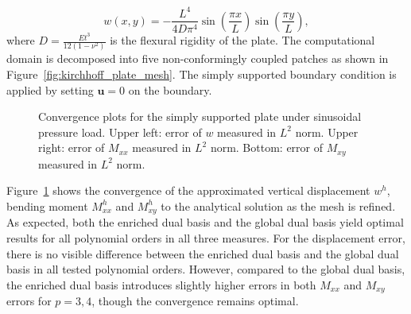 \begin{equation}
	w(x, y) = -\frac{L^4}{4D\pi^4}\sin(\frac{\pi x}{L}) \sin(\frac{\pi y}{L}),
\end{equation}
where $D = \frac{Et^3}{12(1-\nu^2)}$ is the flexural rigidity of the plate. The computational domain is decomposed into five non-conformingly coupled patches as shown in Figure~\ref{fig:kirchhoff_plate_mesh}. The simply supported boundary condition is applied by setting $\mathbf{u}=0$ on the boundary.\par
\begin{figure}[h]
	\center
	\captionsetup[subfigure]{labelformat=empty}
	\begin{subfigure}{.47\linewidth}
		\center
		
	\end{subfigure}\hfil
	\begin{subfigure}{.47\linewidth}
		\center
		
	\end{subfigure}
	\begin{subfigure}{.47\linewidth}
		\center
		
	\end{subfigure}
	\caption{Convergence plots for the simply supported plate under sinusoidal pressure load. Upper left: error of $w$ measured in $L^2$ norm. Upper right: error of $M_{xx}$ measured in $L^2$ norm. Bottom: error of $M_{xy}$ measured in $L^2$ norm.}\label{fig:convergence_square_plate}
\end{figure}
Figure~\ref{fig:convergence_square_plate} shows the convergence of the approximated vertical displacement $w^h$, bending moment $M^h_{xx}$ and $M^h_{xy}$ to the analytical solution as the mesh is refined. As expected, both the enriched \Bezier dual basis and the global dual basis yield optimal results for all polynomial orders in all three measures. For the displacement error, there is no visible difference between the enriched \Bezier dual basis and the global dual basis in all tested polynomial orders. However, compared to the global dual basis, the enriched \Bezier dual basis introduces slightly higher errors in both $M_{xx}$ and $M_{xy}$ errors for $p = 3,4$, though the convergence remains optimal. \par


